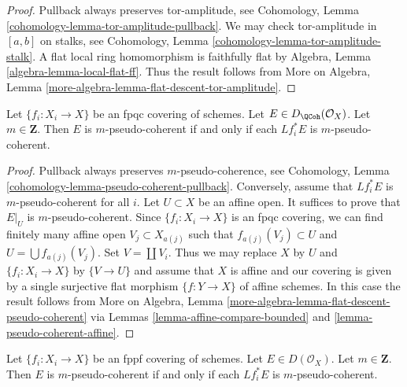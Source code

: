 \begin{proof}
Pullback always preserves tor-amplitude, see
Cohomology, Lemma \ref{cohomology-lemma-tor-amplitude-pullback}.
We may check tor-amplitude in $[a, b]$ on stalks, see
Cohomology, Lemma \ref{cohomology-lemma-tor-amplitude-stalk}.
A flat local ring homomorphism is faithfully flat by
Algebra, Lemma \ref{algebra-lemma-local-flat-ff}.
Thus the result follows from
More on Algebra, Lemma
\ref{more-algebra-lemma-flat-descent-tor-amplitude}.
\end{proof}

\begin{lemma}
\label{lemma-pseudo-coherent-descends-fpqc}
Let $\{f_i : X_i \to X\}$ be an fpqc covering of schemes. Let
$E \in D_\QCoh(\mathcal{O}_X)$. Let $m \in \mathbf{Z}$.
Then $E$ is $m$-pseudo-coherent if and only if each
$Lf_i^*E$ is $m$-pseudo-coherent.
\end{lemma}

\begin{proof}
Pullback always preserves $m$-pseudo-coherence, see
Cohomology, Lemma \ref{cohomology-lemma-pseudo-coherent-pullback}.
Conversely, assume that $Lf_i^*E$ is $m$-pseudo-coherent for all $i$.
Let $U \subset X$ be an affine open. It suffices to prove that
$E|_U$ is $m$-pseudo-coherent. Since $\{f_i : X_i \to X\}$ is an
fpqc covering, we can find finitely many affine open $V_j \subset X_{a(j)}$
such that $f_{a(j)}(V_j) \subset U$ and $U = \bigcup f_{a(j)}(V_j)$.
Set $V = \coprod V_i$.
Thus we may replace $X$ by $U$ and $\{f_i : X_i \to X\}$ by
$\{V \to U\}$ and assume that $X$ is affine and our covering
is given by a single surjective flat morphism $\{f : Y \to X\}$
of affine schemes. In this case the result follows from
More on Algebra, Lemma \ref{more-algebra-lemma-flat-descent-pseudo-coherent}
via Lemmas \ref{lemma-affine-compare-bounded} and
\ref{lemma-pseudo-coherent-affine}.
\end{proof}

\begin{lemma}
\label{lemma-pseudo-coherent-descends-fppf}
Let $\{f_i : X_i \to X\}$ be an fppf covering of schemes. Let
$E \in D(\mathcal{O}_X)$. Let $m \in \mathbf{Z}$.
Then $E$ is $m$-pseudo-coherent if and only if each
$Lf_i^*E$ is $m$-pseudo-coherent.
\end{lemma}

